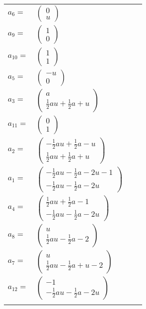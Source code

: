 \documentclass[1p]{elsarticle_modified}
\theoremstyle{definition}
\begin{document}
\begin{tabular}{m{7pt} m{180pt} m{7pt} m{180pt} }
\flushright $a_{6}=$&$\begin{pmatrix}0\\u\end{pmatrix}$ \\
\flushright $a_{9}=$&$\begin{pmatrix}1\\0\end{pmatrix}$ \\
\flushright $a_{10}=$&$\begin{pmatrix}1\\1\end{pmatrix}$ \\
\flushright $a_{5}=$&$\begin{pmatrix}- u\\0\end{pmatrix}$ \\
\flushright $a_{3}=$&$\begin{pmatrix}a\\\frac{1}{2} a u+\frac{1}{2} a+u\end{pmatrix}$ \\
\flushright $a_{11}=$&$\begin{pmatrix}0\\1\end{pmatrix}$ \\
\flushright $a_{2}=$&$\begin{pmatrix}-\frac{1}{2} a u+\frac{1}{2} a- u\\\frac{1}{2} a u+\frac{1}{2} a+u\end{pmatrix}$ \\
\flushright $a_{1}=$&$\begin{pmatrix}-\frac{1}{2} a u-\frac{1}{2} a-2 u-1\\-\frac{1}{2} a u-\frac{1}{2} a-2 u\end{pmatrix}$ \\
\flushright $a_{4}=$&$\begin{pmatrix}\frac{1}{2} a u+\frac{1}{2} a-1\\-\frac{1}{2} a u-\frac{1}{2} a-2 u\end{pmatrix}$ \\
\flushright $a_{8}=$&$\begin{pmatrix}u\\\frac{1}{2} a u-\frac{1}{2} a-2\end{pmatrix}$ \\
\flushright $a_{7}=$&$\begin{pmatrix}u\\\frac{1}{2} a u-\frac{1}{2} a+u-2\end{pmatrix}$ \\
\flushright $a_{12}=$&$\begin{pmatrix}-1\\-\frac{1}{2} a u-\frac{1}{2} a-2 u\end{pmatrix}$\\&\end{tabular}
\end{document}
